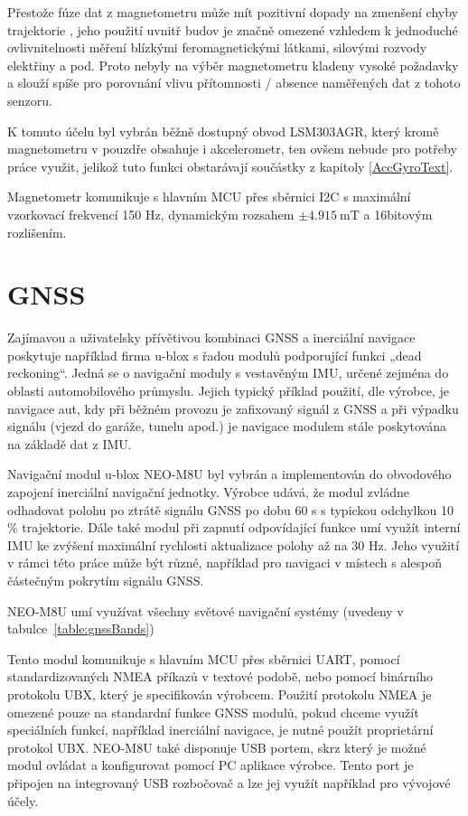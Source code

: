 Přestože fúze dat z magnetometru může mít pozitivní dopady na zmenšení chyby trajektorie \cite{Tkhorenko2018}, jeho použití uvnitř budov je značně omezené vzhledem k jednoduché ovlivnitelnosti měření blízkými feromagnetickými látkami, silovými rozvody elektřiny a pod. Proto nebyly na výběr magnetometru kladeny vysoké požadavky a slouží spíše pro porovnání vlivu přítomnosti / absence naměřených dat z tohoto senzoru.

K tomuto účelu byl vybrán běžně dostupný obvod LSM303AGR, který kromě magnetometru v pouzdře obsahuje i akcelerometr, ten ovšem nebude pro potřeby práce využit, jelikož tuto funkci obstarávají součástky z kapitoly \ref{AccGyroText}.

Magnetometr komunikuje s hlavním \ac{MCU} přes sběrnici \ac{I2C} s maximální vzorkovací frekvencí 150 Hz, dynamickým rozsahem $ \pm \SI{4.915}{\milli\tesla} $ a 16bitovým rozlišením. \cite{RD5DwZcremhT6bgp}

\section{GNSS}
Zajímavou a uživatelsky přívětivou kombinaci \ac{GNSS} a inerciální navigace poskytuje například firma u-blox s řadou modulů podporující funkci „dead reckoning“. Jedná se o navigační moduly s vestavěným \ac{IMU}, určené zejména do oblasti automobilového průmyslu. Jejich typický příklad použití, dle výrobce, je navigace aut, kdy při běžném provozu je zafixovaný signál z \ac{GNSS} a při výpadku signálu (vjezd do garáže, tunelu apod.) je navigace modulem stále poskytována na základě dat z \ac{IMU}. \cite{DLQg9bT6V1GWKhxh}

Navigační modul u-blox NEO-M8U byl vybrán a implementován do obvodového zapojení inerciální navigační jednotky.
Výrobce udává, že modul zvládne odhadovat polohu po ztrátě signálu \ac{GNSS} po dobu 60 s s typickou odchylkou 10 \% trajektorie. Dále také modul při zapnutí odpovídající funkce umí využít interní \ac{IMU} ke zvýšení maximální rychlosti aktualizace polohy až na 30 Hz. Jeho využití v rámci této práce může být různé, například pro navigaci v místech s alespoň částečným pokrytím signálu \ac{GNSS}. \cite{DLQg9bT6V1GWKhxh}

NEO-M8U umí využívat všechny světové navigační systémy (uvedeny v tabulce~\ref{table:gnssBands})

Tento modul komunikuje s hlavním \ac{MCU} přes sběrnici \ac{UART}, pomocí standardizovaných \ac{NMEA} příkazů v textové podobě, nebo pomocí binárního protokolu \ac{UBX}, který je specifikován výrobcem. Použití protokolu \ac{NMEA} je omezené pouze na standardní funkce \ac{GNSS} modulů, pokud chceme využít speciálních funkcí, například inerciální navigace, je nutné použít proprietární protokol \ac{UBX}. \cite{DLQg9bT6V1GWKhxh} NEO-M8U také disponuje \ac{USB} portem, skrz který je možné modul ovládat a konfigurovat pomocí PC aplikace výrobce. Tento port je připojen na integrovaný \ac{USB} rozbočovač a lze jej využít například pro vývojové účely.

